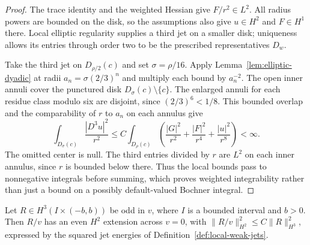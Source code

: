 \begin{proof}
\leanok
The trace identity and the weighted Hessian give $F/r^2\in L^2$.
All radius powers are bounded on the disk, so the assumptions also give
$u\in H^2$ and $F\in H^1$ there. Local elliptic regularity supplies a
third jet on a smaller disk; uniqueness allows its entries through
order two to be the prescribed representatives $D_w$.

Take the third jet on $D_{\rho/2}(c)$ and set $\sigma=\rho/16$.
Apply Lemma~\ref{lem:elliptic-dyadic} at radii $a_n=\sigma(2/3)^n$ and
multiply each bound by $a_n^{-2}$. The open inner annuli cover the
punctured disk $D_\sigma(c)\setminus\{c\}$. The enlarged annuli for each
residue class modulo six are disjoint, since $(2/3)^6<1/8$.
This bounded overlap and the comparability of $r$ to $a_n$ on each
annulus give
\[
 \int_{D_\sigma(c)}\frac{|D^3u|^2}{r^2}
 \le C\int_{D_\rho(c)}
 \left(\frac{|G|^2}{r^2}+\frac{|F|^2}{r^4}
                         +\frac{|u|^2}{r^8}\right)<\infty.
\]
The omitted center is null. The third entries divided by $r$ are $L^2$
on each inner annulus, since $r$ is bounded below there. Thus the local
bounds pass to nonnegative integrals before summing, which proves
weighted integrability rather than just a bound on a possibly
default-valued Bochner integral.
\end{proof}

\begin{lemma}
\label{lem:odd-h3-division}
\leanok
Let $R\in H^3(I\times(-b,b))$ be odd in $v$, where $I$ is a bounded
interval and $b>0$. Then $R/v$ has an even $H^2$ extension across $v=0$,
with $\|R/v\|_{H^2}^2\le C\|R\|_{H^3}^2$, expressed by the squared
jet energies of Definition~\ref{def:local-weak-jets}.
\end{lemma}

